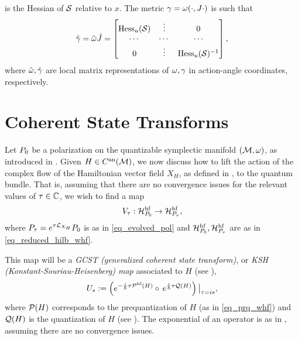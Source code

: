 \documentclass[notas.tex]{subfiles}
\begin{document}
	is the Hessian of $\mathcal{S}$ relative to $x$. The metric $\gamma = \omega(\cdot,J \cdot)$ is such that
	\begin{align}\label{eq_metric_aa}
		\hat{\gamma} = \hat{\omega} \hat{J} = \begin{bmatrix}
			\operatorname{Hess}_u(\mathcal{S}) & \vdots & 0\\
			\cdots & \cdots & \cdots \\
			0 & \vdots & \operatorname{Hess}_u(\mathcal{S})^{-1}
		\end{bmatrix},
	\end{align}
	where $\hat {\omega}, \hat {\gamma}$ are local matrix representations of $\omega, \gamma$ in action-angle coordinates, respectively.

\section{Coherent State Transforms} \label{sec_lifting}
Let $P_0$ be a polarization on the quantizable symplectic manifold $(\mathcal{M}, \omega)$, as introduced in . Given $H \in C^{\text{an}}(\mathcal{M})$, we now discuss how to lift the action of the complex flow of the Hamiltonian vector field $X_H$, as defined in , to the quantum bundle. That is, assuming that there are no convergence issues for the relevant values of $\tau \in \mathbb{C}$, we wish to find a map
\[V_\tau: \mathcal{H}^{\text{hf}}_{P_0} \to \mathcal{H}^{\text{hf}}_{P_\tau},\]
where $P_\tau = e^{\tau \mathcal{L}_{X_H}}P_0$ is as in \eqref{eq_evolved_pol} and $\mathcal{H}^{\text{hf}}_{P_0}, \mathcal{H}^{\text{hf}}_{P_\tau}$ are as in %
\eqref{eq_reduced_hilb_whf}. %

This map will be a \emph{GCST (generalized coherent state transform)}, or \emph{KSH (Konstant-Souriau-Heisenberg) map} associated to $H$ (see \cite{kirwin_complex_2013}),
\begin{equation} \label{eq_cst_def}
U_s := \left ( e^{-\frac{i}{\hbar} \tau \prqhf{H}} \circ e^{\frac{i}{\hbar} \tau \q{H}} \right )\big|_{\tau = is},
\end{equation}
where $\mathcal{P}(H)$ corresponds to the prequantization of $H$ (as in \eqref{eq_prq_whf}) and $\mathcal{Q}(H)$ is the quantization of $H$ (see ). The exponential of an operator is as in , assuming there are no convergence issues. 
\end{document}

